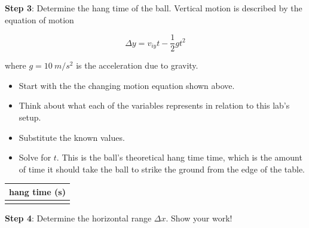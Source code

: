 \documentclass[../main-physics-workbook.tex]{subfiles}
\begin{document}
\noindent \textbf{Step 3}: Determine the hang time of the ball. Vertical motion is described by the equation of motion

\begin{equation*}
    \Delta y = v_{iy} t - \frac{1}{2} g t^2
\end{equation*}

\noindent where $g = \SI{10}{m/s^2}$ is the acceleration due to gravity.

\begin{itemize}[topsep=2pt,itemsep=0pt]
    \item Start with the the changing motion equation shown above.
    \item Think about what each of the variables represents in relation to this lab's setup.
    \item Substitute the known values. 
    \item Solve for $t$. This is the ball's theoretical hang time time, which is the amount of time it should take the ball to strike the ground from the edge of the table.
\end{itemize}


%
\hspace{5mm}
\begin{minipage}{0.25\textwidth}
\begin{center}
    \begin{tabular}{|c|}
        \hline
         \textbf{hang time} (s)\\
         \hline \\[1em]
         \hline
    \end{tabular}
\end{center} 
\end{minipage}

\medskip


\bigskip

\noindent \textbf{Step 4}: Determine the horizontal range $\Delta x$. Show your work!
\end{document}
